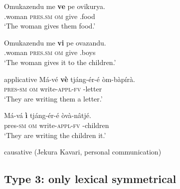 \documentclass[output=paper]{LSP/langsci}
\begin{document}
 \ex\label{ex:vanderwal:12b}
\gll Omukazendu  me  \textbf{ve}  pe  ovikurya.\\
    .woman  \textsc{pres.sm}  \textsc{om}  give  .food\\
    \glt ‘The woman gives them food.’

 \ex\label{ex:vanderwal:12c}
\gll Omukazendu  me  \textbf{vi}  pe  ovazandu.\\
    .woman  \textsc{pres.sm}  \textsc{om}  give  .boys \\
    \glt ‘The woman gives it to the children.’
\z
\z

\ea\label{ex:vanderwal:13}
{applicative \citep[247]{MartenKula2012}}
 \ea\label{ex:vanderwal:13a}
\gll Má-vé  \textbf{vè}  tjáng-ér-é  òm-bàpírà.\\
    \textsc{pres}{}-\textsc{sm}  \textsc{om}  write-\textsc{appl}{}-\textsc{fv}  -letter \\
    \glt ‘They are writing them a letter.’

 \ex\label{ex:vanderwal:13b}
\gll Má-vá  \textbf{ì}  tjáng-ér-é  òvà-nâtjé.\\
    pres-\textsc{sm}  \textsc{om}  write-\textsc{appl}{}-\textsc{fv}  -children\\
    \glt ‘They are writing the children it.’
\z
\z

\ea\label{ex:vanderwal:14}
 {causative (Jekura Kavari, personal communication)}

\z
\z

\subsection{Type 3: only lexical symmetrical}\label{sec:vdw:2.3}
\end{document}
